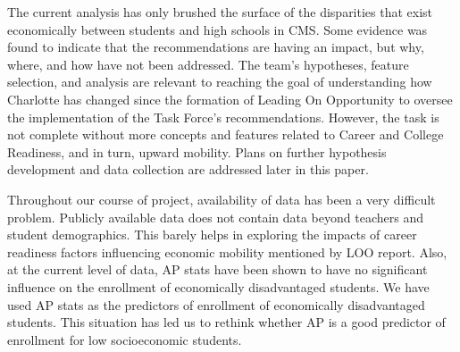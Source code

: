 
The current analysis has only brushed the surface of the disparities that exist economically between students and high schools in CMS. 
Some evidence was found to indicate that the recommendations are having an impact, but why, where, and how have not been addressed. 
The team's hypotheses, feature selection, and analysis are relevant to reaching the goal of understanding how Charlotte has changed since the formation of Leading On Opportunity to oversee the implementation of the Task Force's recommendations. 
However, the task is not complete without more concepts and features related to Career and College Readiness, and in turn, upward mobility. 
Plans on further hypothesis development and data collection are addressed later in this paper.


Throughout our course of project, availability of data has been a very difficult problem. Publicly available data does not contain data beyond teachers and student demographics. This barely helps in exploring the impacts of career readiness factors influencing economic mobility mentioned by LOO report. 
Also, at the current level of data, AP stats have been shown  to have no significant influence on the enrollment of economically disadvantaged students. 
We have used AP stats as the predictors of enrollment of economically disadvantaged students. 
This situation has led us to rethink whether AP is a good predictor of enrollment for low socioeconomic students. 